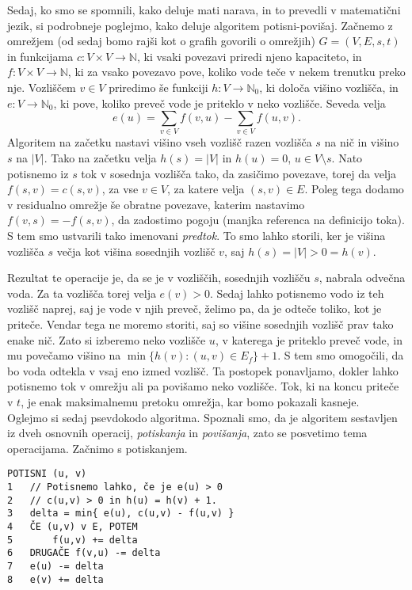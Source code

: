 \documentclass[mat1]{fmfdelo}
\newcommand{\N}{\mathbb N}
\begin{document}
Sedaj, ko smo se spomnili, kako deluje mati narava, in to prevedli v matematični jezik, si podrobneje poglejmo, kako deluje algoritem potisni-povišaj. Začnemo z omrežjem (od sedaj bomo rajši kot o grafih govorili o omrežjih) $G = (V, E, s, t)$ in funkcijama $c\colon V \times V \rightarrow \N$, ki vsaki povezavi priredi njeno kapaciteto, in $f\colon V \times V \rightarrow \N$, ki za vsako povezavo pove, koliko vode teče v nekem trenutku preko nje. Vozliščem $v \in V$ priredimo še funkciji $h\colon V \rightarrow \N_0$, ki določa višino vozlišča, in $e\colon V \rightarrow \N_0$, ki pove, koliko preveč vode je priteklo v neko vozlišče. Seveda velja \[e(u) = \sum_{v \in V} f(v,u) - \sum_{v \in V} f(u,v).\] Algoritem na začetku nastavi višino vseh vozlišč razen vozlišča $s$ na nič in višino $s$ na $|V|$. Tako na začetku velja $h(s) = |V|$ in $h(u) = 0$, $u \in V \setminus {s}$. Nato potisnemo iz $s$ tok v sosednja vozlišča tako, da zasičimo povezave, torej da velja $f(s, v) = c(s, v)$, za vse $v \in V$, za katere velja $(s, v) \in E$. Poleg tega dodamo v residualno omrežje še obratne povezave, katerim nastavimo $f(v,s) = -f(s,v)$, da zadostimo pogoju (manjka referenca na definicijo toka). S tem smo ustvarili tako imenovani \textit{predtok}. To smo lahko storili, ker je višina vozlišča $s$ večja kot višina sosednjih vozlišč $v$, saj $h(s) = |V| > 0 = h(v)$.

Rezultat te operacije je, da se je v vozliščih, sosednjih vozlišču $s$, nabrala odvečna voda. Za ta vozlišča torej velja $e(v) > 0$. Sedaj lahko potisnemo vodo iz teh vozlišč naprej, saj je vode v njih preveč, želimo pa, da je odteče toliko, kot je priteče. Vendar tega ne moremo storiti, saj so višine sosednjih vozlišč prav tako enake nič. Zato si izberemo neko vozlišče $u$, v katerega je priteklo preveč vode, in mu povečamo višino na $\min\{h(v) : (u,v) \in E_f\} + 1$. S tem smo omogočili, da bo voda odtekla v vsaj eno izmed vozlišč. Ta postopek ponavljamo, dokler lahko potisnemo tok v omrežju ali pa povišamo neko vozlišče. Tok, ki na koncu priteče v $t$, je enak maksimalnemu pretoku omrežja, kar bomo pokazali kasneje.\\

Oglejmo si sedaj psevdokodo algoritma. Spoznali smo, da je algoritem sestavljen iz dveh osnovnih operacij, \textit{potiskanja} in \textit{povišanja}, zato se posvetimo tema operacijama. Začnimo s potiskanjem.\\

\begin{verbatim}
POTISNI (u, v)
1   // Potisnemo lahko, če je e(u) > 0
2   // c(u,v) > 0 in h(u) = h(v) + 1.
3   delta = min{ e(u), c(u,v) - f(u,v) }
4   ČE (u,v) v E, POTEM
5       f(u,v) += delta
6   DRUGAČE f(v,u) -= delta
7   e(u) -= delta
8   e(v) += delta
\end{verbatim}~
\end{document}
